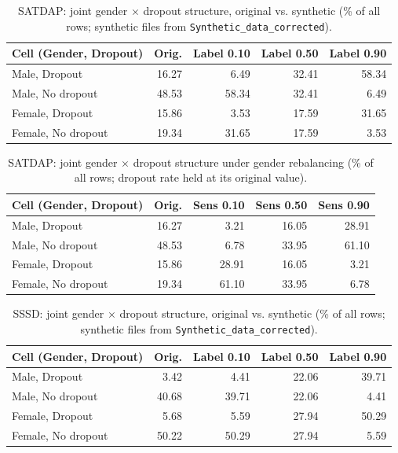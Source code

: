 
\begin{table}[ht]
\centering\footnotesize
\caption{SATDAP: joint gender $\times$ dropout structure, original vs. synthetic
(\% of all rows; synthetic files from \texttt{Synthetic\_data\_corrected}).}
\begin{tabular}{lrrrr}
\toprule
Cell (Gender, Dropout) & Orig. & Label 0.10 & Label 0.50 & Label 0.90 \\
\midrule
Male, Dropout    & 16.27 & 6.49 & 32.41 & 58.34 \\
Male, No dropout & 48.53 & 58.34 & 32.41 & 6.49 \\
Female, Dropout    & 15.86 & 3.53 & 17.59 & 31.65 \\
Female, No dropout & 19.34 & 31.65 & 17.59 & 3.53 \\
\bottomrule
\end{tabular}
\end{table}

\begin{table}[ht]
\centering\footnotesize
\caption{SATDAP: joint gender $\times$ dropout structure under gender rebalancing
(\% of all rows; dropout rate held at its original value).}
\begin{tabular}{lrrrr}
\toprule
Cell (Gender, Dropout) & Orig. & Sens 0.10 & Sens 0.50 & Sens 0.90 \\
\midrule
Male, Dropout    & 16.27 & 3.21 & 16.05 & 28.91 \\
Male, No dropout & 48.53 & 6.78 & 33.95 & 61.10 \\
Female, Dropout    & 15.86 & 28.91 & 16.05 & 3.21 \\
Female, No dropout & 19.34 & 61.10 & 33.95 & 6.78 \\
\bottomrule
\end{tabular}
\end{table}


\begin{table}[ht]
\centering\footnotesize
\caption{SSSD: joint gender $\times$ dropout structure, original vs. synthetic
(\% of all rows; synthetic files from \texttt{Synthetic\_data\_corrected}).}
\begin{tabular}{lrrrr}
\toprule
Cell (Gender, Dropout) & Orig. & Label 0.10 & Label 0.50 & Label 0.90 \\
\midrule
Male, Dropout    & 3.42 & 4.41 & 22.06 & 39.71 \\
Male, No dropout & 40.68 & 39.71 & 22.06 & 4.41 \\
Female, Dropout    & 5.68 & 5.59 & 27.94 & 50.29 \\
Female, No dropout & 50.22 & 50.29 & 27.94 & 5.59 \\
\bottomrule
\end{tabular}
\end{table}

